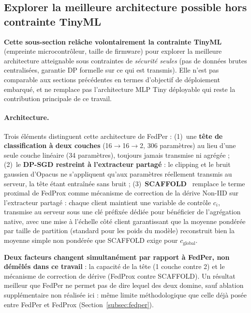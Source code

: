 \documentclass{article}
\begin{document}
\subsection{Explorer la meilleure architecture possible hors contrainte TinyML}
\label{subsec:fedrep_scaffold}

\textbf{Cette sous-section relâche volontairement la contrainte TinyML} (empreinte
microcontrôleur, taille de firmware) pour explorer la meilleure architecture atteignable
sous contraintes de \emph{sécurité seules} (pas de données brutes centralisées, garantie
DP formelle sur ce qui est transmis). Elle n'est pas comparable aux sections
précédentes en termes d'objectif de déploiement embarqué, et ne remplace pas
l'architecture MLP Tiny déployable qui reste la contribution principale de ce travail.

\paragraph{Architecture.} Trois éléments distinguent cette architecture de FedPer : (1)~une
\textbf{tête de classification à deux couches} (16$\to$16$\to$2, 306 paramètres) au lieu
d'une seule couche linéaire (34 paramètres), toujours jamais transmise ni agrégée ;
(2)~le \textbf{DP-SGD restreint à l'extracteur partagé} : le clipping et le bruit
gaussien d'Opacus ne s'appliquent qu'aux paramètres réellement transmis au serveur, la
tête étant entraînée sans bruit ; (3)~\textbf{SCAFFOLD}~\cite{karimireddy2020scaffold}
remplace le terme proximal de FedProx comme mécanisme de correction de la dérive
Non-IID sur l'extracteur partagé : chaque client maintient une variable de contrôle
$c_i$, transmise au serveur sous une clé préfixée dédiée pour bénéficier de
l'agrégation native, avec une mise à l'échelle côté client garantissant que la moyenne
pondérée par taille de partition (standard pour les poids du modèle) reconstruit bien la
moyenne simple non pondérée que SCAFFOLD exige pour $c_{\text{global}}$.

\textbf{Deux facteurs changent simultanément par rapport à FedPer, non démêlés dans ce
travail} : la capacité de la tête (1 couche contre 2) et le mécanisme de correction de
dérive (FedProx contre SCAFFOLD). Un résultat meilleur que FedPer ne permet pas de dire
lequel des deux domine, sauf ablation supplémentaire non réalisée ici : même limite
méthodologique que celle déjà posée entre FedPer et FedProx (Section~\ref{subsec:fedper}).
\end{document}

